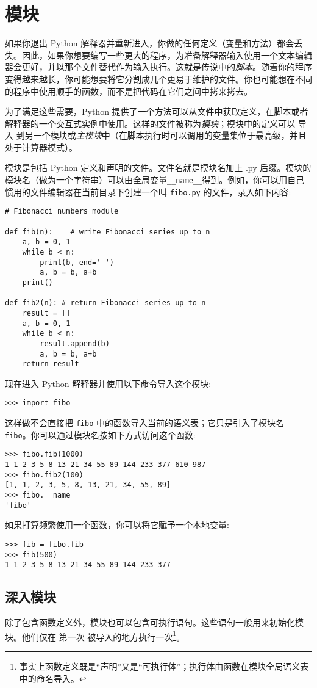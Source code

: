 \chapter{模块\label{Modules}}
如果你退出 Python 解释器并重新进入，你做的任何定义（变量和方法）都会丢失。因此，如果你想要编写一些更大的程序，为准备解释器输入使用一个文本编辑器会更好，并以那个文件替代作为输入执行。这就是传说中的\emph{脚本}。随着你的程序变得越来越长，你可能想要将它分割成几个更易于维护的文件。你也可能想在不同的程序中使用顺手的函数，而不是把代码在它们之间中拷来拷去。

为了满足这些需要，Python 提供了一个方法可以从文件中获取定义，在脚本或者解释器的一个交互式实例中使用。这样的文件被称为\emph{模块}；模块中的定义可以 导入 到另一个模块或\emph{主模块}中（在脚本执行时可以调用的变量集位于最高级，并且处于计算器模式）。

模块是包括 Python 定义和声明的文件。文件名就是模块名加上 .py 后缀。模块的模块名（做为一个字符串）可以由全局变量\verb|__name__|得到。例如，你可以用自己惯用的文件编辑器在当前目录下创建一个叫 \texttt{fibo.py} 的文件，录入如下内容:
\begin{lstlisting}
# Fibonacci numbers module

def fib(n):    # write Fibonacci series up to n
    a, b = 0, 1
    while b < n:
        print(b, end=' ')
        a, b = b, a+b
    print()

def fib2(n): # return Fibonacci series up to n
    result = []
    a, b = 0, 1
    while b < n:
        result.append(b)
        a, b = b, a+b
    return result
\end{lstlisting}

现在进入 Python 解释器并使用以下命令导入这个模块:
\begin{lstlisting}
>>> import fibo
\end{lstlisting}
这样做不会直接把 \texttt{fibo} 中的函数导入当前的语义表；它只是引入了模块名 \texttt{fibo}。你可以通过模块名按如下方式访问这个函数:
\begin{lstlisting}
>>> fibo.fib(1000)
1 1 2 3 5 8 13 21 34 55 89 144 233 377 610 987
>>> fibo.fib2(100)
[1, 1, 2, 3, 5, 8, 13, 21, 34, 55, 89]
>>> fibo.__name__
'fibo'
\end{lstlisting}

如果打算频繁使用一个函数，你可以将它赋予一个本地变量:
\begin{lstlisting}
>>> fib = fibo.fib
>>> fib(500)
1 1 2 3 5 8 13 21 34 55 89 144 233 377
\end{lstlisting}
\section{深入模块}
除了包含函数定义外，模块也可以包含可执行语句。这些语句一般用来初始化模块。他们仅在 第一次 被导入的地方执行一次\footnote{事实上函数定义既是“声明”又是“可执行体”；执行体由函数在模块全局语义表中的命名导入。}。


